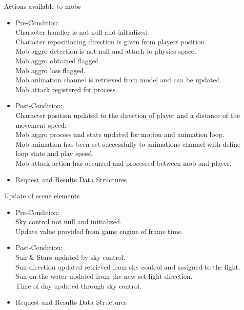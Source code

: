 \documentclass[letterpaper]{article}
\begin{document}
					\vspace{0.1in}
					Actions available to mobs
					\begin{itemize}
						\item Pre-Condition: \\
							Character handler is not null and initialized. \\
							Character repositioning direction is given from players position. \\
							Mob aggro detection is not null and attach to physics space. \\
							Mob aggro obtained flagged. \\
							Mob aggro loss flagged. \\
							Mob animation channel is retrieved from model and can be updated. \\
							Mob attack registered for process.
						\item Post-Condition: \\
							Character position updated to the direction of player and a distance of the movement speed. \\
							Mob aggro process and state updated for motion and animation loop. \\
							Mob animation has been set successfully to animations channel with define loop state and play speed. \\
							Mob attack action has occurred and processed between mob and player.
						\item Request and Results Data Structures \\
						
					\end{itemize}
					
					\vspace{0.1in}
					Update of scene elements
					\begin{itemize}
						\item Pre-Condition: \\
							Sky control not null and initialized. \\
							Update value provided from game engine of frame time.
						\item Post-Condition: \\
							Sun \& Stars updated by sky control. \\
							Sun direction updated retrieved from sky control and assigned to the light. \\
							Sun on the water updated from the new set light direction. \\
							Time of day updated through sky control.
						\item Request and Results Data Structures \\
						
					\end{itemize}
					
\end{document}

